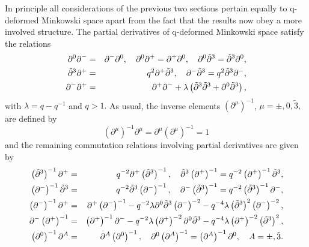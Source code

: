 \documentclass[a4paper,11pt,oneside]{article}
\begin{document}
In principle all considerations of the previous two sections pertain equally
to q-deformed Minkowski space \cite{LWW97} apart from the fact that the
results now obey a more involved structure. The partial derivatives of
q-deformed Minkowski space satisfy the relations 
\begin{eqnarray}
\partial ^{0}\partial ^{-} &=&\partial ^{-}\partial ^{0},\quad \partial
^{0}\partial ^{+}=\partial ^{+}\partial ^{0},\quad \partial ^{0}\tilde{%
\partial}^{3}=\tilde{\partial}^{3}\partial ^{0},  \label{Derivative} \\
\tilde{\partial}^{3}\partial ^{+} &=&q^{2}\partial ^{+}\tilde{\partial}%
^{3},\quad \partial ^{-}\tilde{\partial}^{3}=q^{2}\tilde{\partial}%
^{3}\partial ^{-},  \nonumber \\
\partial ^{-}\partial ^{+} &=&\partial ^{+}\partial ^{-}+\lambda \left( 
\tilde{\partial}^{3}\tilde{\partial}^{3}+\partial ^{0}\tilde{\partial}%
^{3}\right) ,  \nonumber
\end{eqnarray} 
with $\lambda =q-q^{-1}$ and $q>1.$ As usual, the inverse elements $\left(
\partial ^{\mu}\right) ^{-1}$, $\mu=\pm ,0,\tilde{3},$ are defined by 
\begin{equation}
\left( \partial ^{\mu}\right) ^{-1}\partial ^{\mu} =\partial ^{\mu}\left(
\partial ^{\mu}\right) ^{-1}=1
\end{equation}
and the remaining commutation relations involving partial derivatives
 are given by 
\begin{eqnarray}
\left( \tilde{\partial}^{3}\right) ^{-1}\partial ^{+} &=&q^{-2}\partial
^{+}\left( \tilde{\partial}^{3}\right) ^{-1},\quad \tilde{\partial}%
^{3}\left( \partial ^{+}\right) ^{-1}=q^{-2}\left( \partial ^{+}\right) ^{-1}%
\tilde{\partial}^{3}, \\
\left( \partial ^{-}\right) ^{-1}\tilde{\partial}^{3} &=&q^{-2}\tilde{%
\partial}^{3}\left( \partial ^{-}\right) ^{-1},\quad \partial ^{-}\left( 
\tilde{\partial}^{3}\right) ^{-1}=q^{-2}\left( \tilde{\partial}^{3}\right)
^{-1}\partial ^{-},  \nonumber \\
\left( \partial ^{-}\right) ^{-1}\partial ^{+} &=&\partial ^{+}\left(
\partial ^{-}\right) ^{-1}-q^{-2}\lambda \partial ^{0}\tilde{\partial}%
^{3}\left( \partial ^{-}\right) ^{-2}-q^{-4}\lambda \left( \tilde{\partial}%
^{3}\right) ^{2}\left( \partial ^{-}\right) ^{-2},  \nonumber \\
\partial ^{-}\left( \partial ^{+}\right) ^{-1} &=&\left( \partial
^{+}\right) ^{-1}\partial ^{-}-q^{-2}\lambda \left( \partial ^{+}\right)
^{-2}\partial ^{0}\tilde{\partial}^{3}-q^{-4}\lambda \left( \partial
^{+}\right) ^{-2}\left( \tilde{\partial}^{3}\right) ^{2},  \nonumber \\
\left( \partial ^{0}\right) ^{-1}\partial ^{A} &=&\partial ^{A}\left(
\partial ^{0}\right) ^{-1},\quad \partial ^{0}\left( \partial ^{A}\right)
^{-1}=\left( \partial ^{A}\right) ^{-1}\partial ^{0},\quad A=\pm ,\tilde{3}.
\nonumber
\end{eqnarray}
\end{document}
